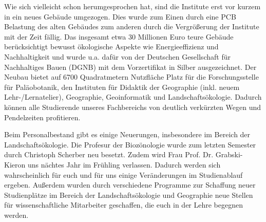 Wie sich vielleicht schon herumgesprochen hat, sind die Institute erst vor kurzem in ein neues Gebäude umgezogen. Dies wurde zum Einen durch eine PCB Belastung des alten Gebäudes zum anderen durch die Vergrößerung der Institute mit der Zeit fällig. Das insgesamt etwa 30 Millionen Euro teure Gebäude berücksichtigt bewusst ökologische Aspekte wie Energieeffizienz und Nachhaltigkeit und wurde u.a. dafür von der Deutschen Gesellschaft für Nachhaltiges Bauen (DGNB) mit dem Vorzertifikat in Silber ausgezeichnet. Der Neubau bietet auf 6700 Quadratmetern Nutzfläche Platz für die Forschungsstelle für Paläobotanik, den Instituten für Didaktik der Geographie (inkl. neuem Lehr-/Lernatelier), Geographie, Geoinformatik und Landschaftsökologie. Dadurch können alle Studierende unseres Fachbereichs von deutlich verkürzten Wegen und Pendelzeiten profitieren.

Beim Personalbestand gibt es einige Neuerungen, insbesondere im Bereich der Landschaftsökologie. Die Profesur der Biozönologie wurde zum letzten Semester durch Christoph Scherber neu besetzt. Zudem wird Frau Prof. Dr. Grabski-Kieron  uns nächtes Jahr im Frühling verlassen. Dadurch werden sich wahrscheinlich für euch und für uns einige Veränderungen im Studienablauf ergeben. Außerdem wurden durch verschiedene Programme zur Schaffung neuer Studienplätze im Bereich der Landschaftsökologie und Geographie neue Stellen für wissenschaftliche Mitarbeiter geschaffen, die euch in der Lehre begegnen werden.

